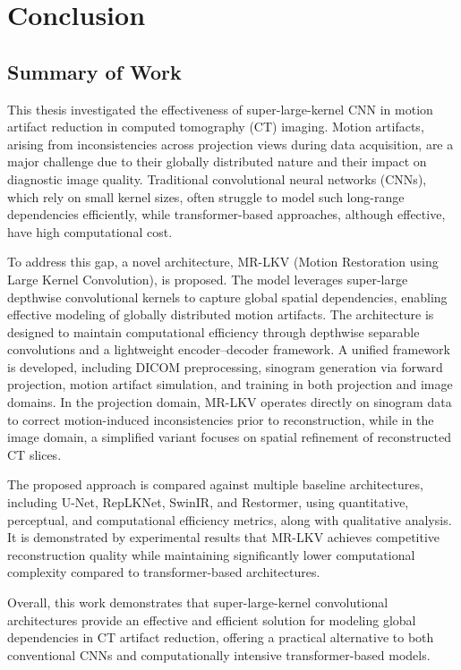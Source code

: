 \chapter{Conclusion}
\label{chap:conclusion}

\section{Summary of Work}
This thesis investigated the effectiveness of super-large-kernel CNN in motion artifact reduction in computed tomography (CT) imaging. Motion artifacts, arising from inconsistencies across projection views during data acquisition, are a major challenge due to their globally distributed nature and their impact on diagnostic image quality. Traditional convolutional neural networks (CNNs), which rely on small kernel sizes, often struggle to model such long-range dependencies efficiently, while transformer-based approaches, although effective, have high computational cost.

To address this gap, a novel architecture, MR-LKV (Motion Restoration using Large Kernel Convolution), is proposed. The model leverages super-large depthwise convolutional kernels to capture global spatial dependencies, enabling effective modeling of globally distributed motion artifacts. The architecture is designed to maintain computational efficiency through depthwise separable convolutions and a lightweight encoder–decoder framework.
A unified framework is developed, including DICOM preprocessing, sinogram generation via forward projection, motion artifact simulation, and training in both projection and image domains. In the projection domain, MR-LKV operates directly on sinogram data to correct motion-induced inconsistencies prior to reconstruction, while in the image domain, a simplified variant focuses on spatial refinement of reconstructed CT slices.


The proposed approach is compared against multiple baseline architectures, including U-Net, RepLKNet, SwinIR, and Restormer, using quantitative, perceptual, and computational efficiency metrics, along with qualitative analysis. It is demonstrated by experimental results that MR-LKV achieves competitive reconstruction quality while maintaining significantly lower computational complexity compared to transformer-based architectures.

 Overall, this work demonstrates that super-large-kernel convolutional architectures provide an effective and efficient solution for modeling global dependencies in CT artifact reduction, offering a practical alternative to both conventional CNNs and computationally intensive transformer-based models.  
 


